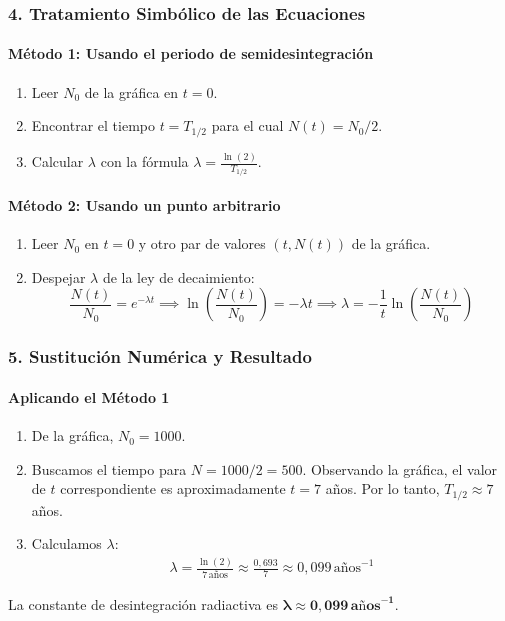 \subsubsection*{4. Tratamiento Simbólico de las Ecuaciones}
\paragraph*{Método 1: Usando el periodo de semidesintegración}
\begin{enumerate}
    \item Leer $N_0$ de la gráfica en $t=0$.
    \item Encontrar el tiempo $t=T_{1/2}$ para el cual $N(t) = N_0/2$.
    \item Calcular $\lambda$ con la fórmula $\lambda = \frac{\ln(2)}{T_{1/2}}$.
\end{enumerate}

\paragraph*{Método 2: Usando un punto arbitrario}
\begin{enumerate}
    \item Leer $N_0$ en $t=0$ y otro par de valores $(t, N(t))$ de la gráfica.
    \item Despejar $\lambda$ de la ley de decaimiento:
    $$ \frac{N(t)}{N_0} = e^{-\lambda t} \implies \ln\left(\frac{N(t)}{N_0}\right) = -\lambda t \implies \lambda = -\frac{1}{t}\ln\left(\frac{N(t)}{N_0}\right) $$
\end{enumerate}

\subsubsection*{5. Sustitución Numérica y Resultado}
\paragraph*{Aplicando el Método 1}
\begin{enumerate}
    \item De la gráfica, $N_0 = 1000$.
    \item Buscamos el tiempo para $N = 1000/2 = 500$. Observando la gráfica, el valor de $t$ correspondiente es aproximadamente $t = 7$ años. Por lo tanto, $T_{1/2} \approx 7$ años.
    \item Calculamos $\lambda$:
    \begin{gather}
        \lambda = \frac{\ln(2)}{7\,\text{años}} \approx \frac{0,693}{7} \approx 0,099\,\text{años}^{-1}
    \end{gather}
\end{enumerate}
\begin{cajaresultado}
    La constante de desintegración radiactiva es $\boldsymbol{\lambda \approx 0,099\,\textbf{años}^{-1}}$.
\end{cajaresultado}

